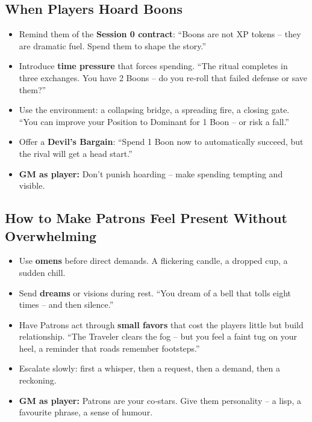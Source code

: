\subsection*{When Players Hoard Boons}
\begin{itemize}
  \item Remind them of the \textbf{Session 0 contract}: “Boons are not XP tokens – they are dramatic fuel. Spend them to shape the story.”
  \item Introduce \textbf{time pressure} that forces spending. “The ritual completes in three exchanges. You have 2 Boons – do you re‑roll that failed defense or save them?”
  \item Use the environment: a collapsing bridge, a spreading fire, a closing gate. “You can improve your Position to Dominant for 1 Boon – or risk a fall.”
  \item Offer a \textbf{Devil’s Bargain}: “Spend 1 Boon now to automatically succeed, but the rival will get a head start.”
  \item \textbf{GM as player:} Don’t punish hoarding – make spending tempting and visible.
\end{itemize}

\subsection*{How to Make Patrons Feel Present Without Overwhelming}
\begin{itemize}
  \item Use \textbf{omens} before direct demands. A flickering candle, a dropped cup, a sudden chill.
  \item Send \textbf{dreams} or visions during rest. “You dream of a bell that tolls eight times – and then silence.”
  \item Have Patrons act through \textbf{small favors} that cost the players little but build relationship. “The Traveler clears the fog – but you feel a faint tug on your heel, a reminder that roads remember footsteps.”
  \item Escalate slowly: first a whisper, then a request, then a demand, then a reckoning.
  \item \textbf{GM as player:} Patrons are your co‑stars. Give them personality – a lisp, a favourite phrase, a sense of humour.
\end{itemize}

